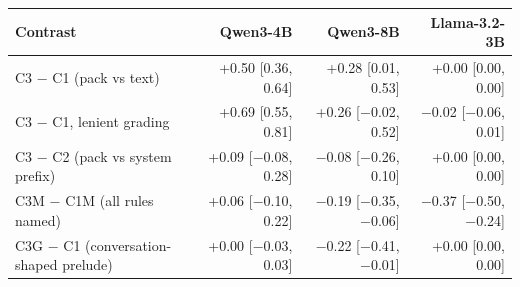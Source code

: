 \begin{tabular}{lrrr}
\toprule
Contrast & Qwen3-4B & Qwen3-8B & Llama-3.2-3B \\
\midrule
C3 $-$ C1 (pack vs text) & +0.50 [0.36, 0.64] & +0.28 [0.01, 0.53] & +0.00 [0.00, 0.00] \\
C3 $-$ C1, lenient grading & +0.69 [0.55, 0.81] & +0.26 [$-$0.02, 0.52] & $-$0.02 [$-$0.06, 0.01] \\
C3 $-$ C2 (pack vs system prefix) & +0.09 [$-$0.08, 0.28] & $-$0.08 [$-$0.26, 0.10] & +0.00 [0.00, 0.00] \\
C3M $-$ C1M (all rules named) & +0.06 [$-$0.10, 0.22] & $-$0.19 [$-$0.35, $-$0.06] & $-$0.37 [$-$0.50, $-$0.24] \\
C3G $-$ C1 (conversation-shaped prelude) & +0.00 [$-$0.03, 0.03] & $-$0.22 [$-$0.41, $-$0.01] & +0.00 [0.00, 0.00] \\
\bottomrule
\end{tabular}
